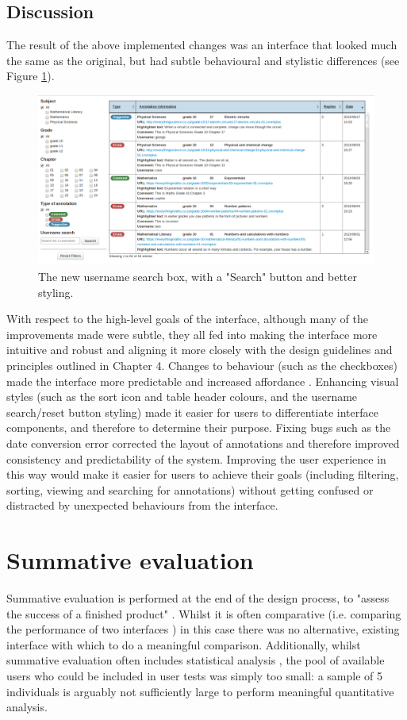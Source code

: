 \subsection{Discussion}
The result of the above implemented changes was an interface that looked much the same as the original, but had subtle behavioural and stylistic differences (see Figure \ref{fig:newinterface}). 
\begin{figure}
    \centering
    \includegraphics[width=\textwidth]{Figures/V2/wholeUI.png}
 \caption{The new username search box, with a "Search" button and better styling.}
 \label{fig:newinterface}
\end{figure}

With respect to the high-level goals of the interface, although many of the improvements made were subtle, they all fed into making the interface more intuitive and robust and aligning it more closely with the design guidelines and principles outlined in Chapter 4. Changes to behaviour (such as the checkboxes) made the interface more predictable and increased affordance \citep[p. 29]{RogersPreece}. Enhancing visual styles (such as the sort icon and table header colours, and the username search/reset button styling) made it easier for users to differentiate interface components, and therefore to determine their purpose. Fixing bugs such as the date conversion error corrected the layout of annotations and therefore improved consistency and predictability of the system. Improving the user experience in this way would make it easier for users to achieve their goals (including filtering, sorting, viewing and searching for annotations) without getting confused or distracted by unexpected behaviours from the interface. 


\section{Summative evaluation}
Summative evaluation is performed at the end of the design process, to "assess the success of a finished product" \citep[p. 437]{RogersPreece}. Whilst it is often comparative (i.e. comparing the performance of two interfaces \citep[p. 54]{GabbardHix}) in this case there was no alternative, existing interface with which to do a meaningful comparison. Additionally, whilst summative evaluation often includes statistical analysis \cite[p. 149]{Hartson}, the pool of available users who could be included in user tests was simply too small: a sample of 5 individuals is arguably not sufficiently large to perform meaningful quantitative analysis. 

